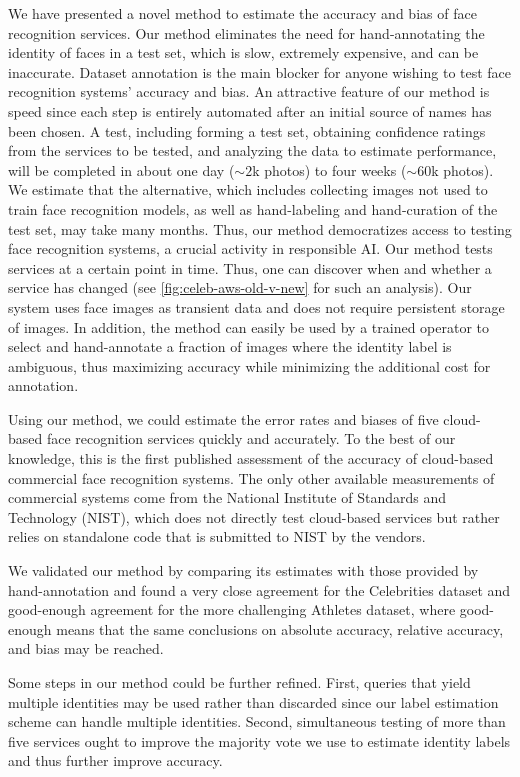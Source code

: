\documentclass[10pt,twocolumn,letterpaper]{article}
\newcommand*{\simsym}{\mathord\sim}
\begin{document}
We have presented a novel method to estimate the accuracy and bias of face recognition services. Our method eliminates the need for hand-annotating the identity of faces in a test set, which is slow, extremely expensive, and can be inaccurate. Dataset annotation is the main blocker for anyone wishing to test face recognition systems' accuracy and bias. An attractive feature of our method is speed since each step is entirely automated after an initial source of names has been chosen.  A test, including forming a test set, obtaining confidence ratings from the services to be tested, and analyzing the data to estimate performance, will be completed in about one day ($\simsym2$k photos) to four weeks ($\simsym60$k photos). We estimate that the alternative, which includes collecting images not used to train face recognition models, as well as hand-labeling and hand-curation of the test set, may take many months. Thus, our method democratizes access to testing face recognition systems, a crucial activity in responsible AI.
%
Our method tests services at a certain point in time. Thus, one can discover when and whether a service has changed (see \cref{fig:celeb-aws-old-v-new} for such an analysis).
%
Our system uses face images as transient data and does not require persistent storage of images.
%
In addition, the method can easily be used by a trained operator to select and hand-annotate a fraction of images where the identity label is ambiguous, thus maximizing accuracy while minimizing the additional cost for annotation.

Using our method, we could estimate the error rates and biases of five cloud-based face recognition services quickly and accurately. To the best of our knowledge, this is the first published assessment of the accuracy of cloud-based commercial face recognition systems. The only other available measurements of commercial systems come from the National Institute of Standards and Technology (NIST), which does not directly test cloud-based services but rather relies on standalone code that is submitted to NIST by the vendors. 

We validated our method by comparing its estimates with those provided by hand-annotation and found a very close agreement for the Celebrities dataset and good-enough agreement for the more challenging Athletes dataset, where good-enough means that the same conclusions on absolute accuracy, relative accuracy, and bias may be reached.

Some steps in our method could be further refined. First, queries that yield multiple identities may be used rather than discarded since our label estimation scheme can handle multiple identities. Second, simultaneous testing of more than five services ought to improve the majority vote we use to estimate identity labels and thus further improve accuracy. 
\end{document}
